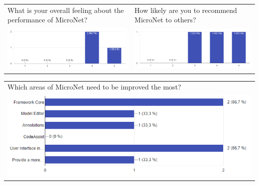\begin{center}
\begin{tabular}{ p{8.7cm} p{8.7cm} }
    \end{tabular}
    \hspace*{-1.9cm}
  	\begin{tabular}{ p{8.7cm} p{8.7cm} }
    	What is your overall feeling about the performance of MicroNet? &
    	How likely are you to recommend MicroNet to others? \\
    	\includegraphics[width=\linewidth]{images/survey/mn5}
    	&
    	\includegraphics[width=\linewidth]{images/survey/mn7}\\[1cm]
    	
    \end{tabular}
\end{center}

\begin{center}
	\hspace*{-1.9cm}
  	\begin{tabular}{ p{17.4cm} }
  	Which areas of MicroNet need to be improved the most? \\
  	
  	\includegraphics[width=\linewidth]{images/survey/mn6}
    \\
  	
  	\end{tabular}
\end{center}

